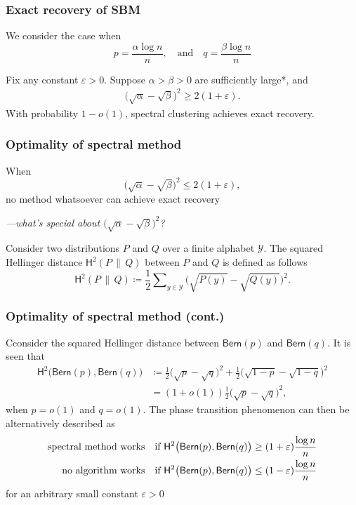 \documentclass[compress,
mathserif,wide,%
]{beamer}
\begin{document}
\begin{frame}
	\frametitle{Exact recovery of SBM}
	We consider the case when
	\[
	p=\frac{\alpha \log n}{n}, \quad \text{and} \quad q=\frac{\beta \log n}{n}
	\]
	
	\begin{theorem}
	\label{thm:community-recovery-linf}
	Fix any constant $\varepsilon>0$. Suppose $\alpha > \beta >0$ are sufficiently large*, and	%
	\begin{align}
		\big( \sqrt{\alpha} -\sqrt{\beta}\big)^2 \geq   2\left( 1+ \varepsilon  \right) .
		\label{eq:H-pq-lower-bound-theorem}
	\end{align}
	With probability  $1-o(1)$, spectral clustering achieves exact recovery. 
\end{theorem}


\end{frame}

\begin{frame}
	\frametitle{Optimality of spectral method}
	When 
	\[
	\big( \sqrt{\alpha} -\sqrt{\beta}\big)^2 \leq   2\left( 1+ \varepsilon  \right),
	\]
	no method whatsoever can achieve exact recovery
	
	{\hfill \em ---what's special about $\big( \sqrt{\alpha} -\sqrt{\beta}\big)^2 $?}
	
	\vfill
	\begin{definition}
%
\label{defn:Hellinger-distance}
Consider two distributions $P$ and $Q$ over a finite alphabet $\mathcal{Y}$. The squared Hellinger distance $\mathsf{H}^2(P\,\|\,Q)$ between $P$ and $Q$  is defined as follows	%
\begin{equation}
\mathsf{H}^2(P\,\|\,Q)\coloneqq\frac{1}{2}\sum\nolimits_{y\in \mathcal{Y}}\Big(\sqrt{P(y)}-\sqrt{Q(y)}\Big)^{2}.
\label{eq:defn-Hellinger-PQ}
\end{equation}
%
\end{definition}
\end{frame}

\begin{frame}
	\frametitle{Optimality of spectral method (cont.)}
	Cconsider the squared Hellinger distance between $\mathsf{Bern}(p)$ and $\mathsf{Bern}(q)$. It is seen that %
\begin{align*}
	\mathsf{H}^2\big( \mathsf{Bern}(p),   \mathsf{Bern}(q) \big) 
	&\coloneqq \frac{1}{2} \big( \sqrt{p} -\sqrt{q}\big)^2 + \frac{1}{2} \big( \sqrt{1-p} -\sqrt{1-q}\big)^2 \nonumber\\
	&= (1+o(1)) \frac{1}{2} \big( \sqrt{p} -\sqrt{q}\big)^2,
\end{align*}
%
when $p=o(1)$ and $q=o(1)$. 
The phase transition phenomenon  can then be alternatively described as
%
\begin{align*}
\text{\text{spectral method works}}\quad & \text{if }\mathsf{H}^{2}\big(\mathsf{Bern}(p),\mathsf{Bern}(q)\big)\geq(1+\varepsilon)\frac{\log n}{n}\\
\text{no algorithm works}\quad & \text{if }\mathsf{H}^{2}\big(\mathsf{Bern}(p),\mathsf{Bern}(q)\big)\leq(1-\varepsilon)\frac{\log n}{n}
\end{align*}
%
for an arbitrary small constant $\varepsilon >0$
\end{frame}
\end{document}
